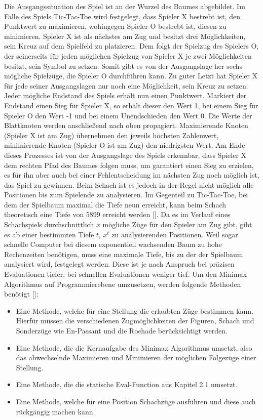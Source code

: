 Die Ausgangssituation des Spiel ist an der Wurzel des Baumes abgebildet.
Im Falle des Spiels Tic-Tac-Toe wird festgelegt, dass Spieler X bestrebt ist, den Punktwert zu maximieren, wohingegen Spieler O bestrebt ist, diesen zu minimieren.
Spieler X ist als nächstes am Zug und besitzt drei Möglichkeiten, sein Kreuz auf dem Spielfeld zu platzieren.
Dem folgt der Spielzug des Spielers O, der seinerseits für jeden möglichen Spielzug von Spieler X je zwei Möglichkeiten besitzt, sein Symbol zu setzen.
Somit gibt es von der Ausgangslage her sechs mögliche Spielzüge, die Spieler O durchführen kann.
Zu guter Letzt hat Spieler X für jede seiner Ausgangslagen nur noch eine Möglichkeit, sein Kreuz zu setzen.
Jeder mögliche Endstand des Spiels erhält nun einen Punktwert.
Markiert der Endstand einen Sieg für Spieler X, so erhält dieser den Wert 1, bei einem Sieg für Spieler O den Wert -1 und bei einem Unendschieden den Wert 0.
Die Werte der Blattknoten werden anschließend nach oben propagiert.
Maximierende Knoten (Spieler X ist am Zug) übernehmen den jeweils höchsten Zahlenwert, minimierende Knoten (Spieler O ist am Zug) den niedrigsten Wert.
Am Ende dieses Prozesses ist von der Ausgangslage des Spiels erkennbar, dass Spieler X dem rechten Pfad des Baumes folgen muss, um garantiert einen Sieg zu erzielen, es für ihn aber auch bei einer Fehlentscheidung im nächsten Zug noch möglich ist, das Spiel zu gewinnen.
Beim Schach ist es jedoch in der Regel nicht möglich alle Positionen bis zum Spielende zu analysieren.
Im Gegenteil zu Tic-Tac-Toe, bei dem der Spielbaum maximal die Tiefe neun erreicht, kann beim Schach theoretisch eine Tiefe von 5899 erreicht werden [\cite{Wikipedia2018}].
Da es im Verlauf eines Schachspiels durchschnittlich $x$ mögliche Züge für den Spieler am Zug gibt, gibt es ab einer bestimmten Tiefe $t$, $x^t$ zu analysierenden Positionen.
Weil sogar schnelle Computer bei diesem exponentiell wachsenden Baum zu hohe Rechenzeiten benötigen, muss eine maximale Tiefe, bis zu der der Spielbaum analysiert wird, festgelegt werden.
Diese ist je nach Anspruch bei präzisen Evaluationen tiefer, bei schnellen Evaluationen weniger tief.
Um den Minimax Algorithmus auf Programmierebene umzusetzen, werden folgende Methoden benötigt [\cite{Shannon1950}]:

\begin{itemize}
    \item Eine Methode, welche für eine Stellung die erlaubten Züge bestimmen kann. Hierfür müssen die verschiedenen Zugmöglichkeiten der Figuren, Schach und Sonderzüge wie En-Passant und die Rochade berücksichtigt werden.
    \item Eine Methode, die die Kernaufgabe des Minimax Algorithmus umsetzt, also das abwechselnde Maximieren und Minimieren der möglichen Folgezüge einer Stellung.
    \item Eine Methode, die die statische Eval-Function aus Kapitel 2.1 umsetzt.
    \item Eine Methode, welche für eine Position Schachzüge ausführen und diese auch rückgängig machen kann.
\end{itemize}

